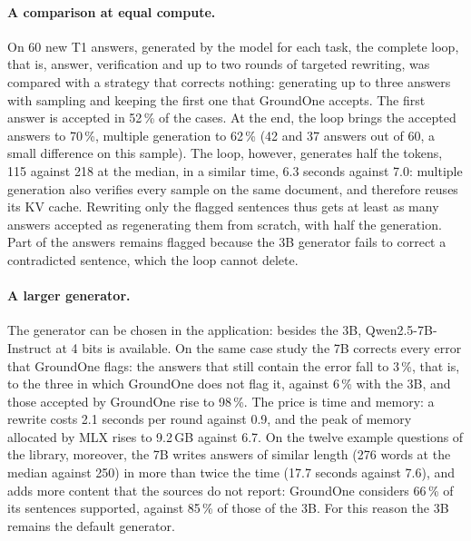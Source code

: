 \paragraph{A comparison at equal compute.} On 60 new T1 answers, generated by the model for each task, the complete
loop, that is, answer, verification and up to two rounds of targeted rewriting, was compared with a strategy that
corrects nothing: generating up to three answers with sampling and keeping the first one that GroundOne accepts. The
first answer is accepted in 52\,\% of the cases. At the end, the loop brings the accepted answers to 70\,\%, multiple generation to 62\,\% (42 and 37 answers out of 60, a small difference on this sample). The loop, however, generates half the tokens, 115 against 218 at the median, in a similar time, 6.3 seconds against 7.0: multiple generation also verifies every sample on the same document, and therefore reuses its KV cache. Rewriting only the flagged sentences thus gets at least as many answers accepted as regenerating them from scratch, with half the generation. Part of the answers remains flagged because the 3B generator
fails to correct a contradicted sentence, which the loop cannot delete.

\paragraph{A larger generator.} The generator can be chosen in the application: besides the 3B,
Qwen2.5-7B-Instruct at 4 bits is available. On the same case study the 7B corrects every error that GroundOne flags: the
answers that still contain the error fall to 3\,\%, that is, to the three in which GroundOne does not flag it, against
6\,\% with the 3B, and those accepted by GroundOne rise to 98\,\%. The price is time and memory: a rewrite costs 2.1
seconds per round against 0.9, and the peak of memory allocated by MLX rises to 9.2\,GB against 6.7. On the twelve
example questions of the library, moreover, the 7B writes answers of similar length (276 words at the median against
250) in more than twice the time (17.7 seconds against 7.6), and adds more content that the sources do not report:
GroundOne considers 66\,\% of its sentences supported, against 85\,\% of those of the 3B. For this reason the 3B remains
the default generator.

